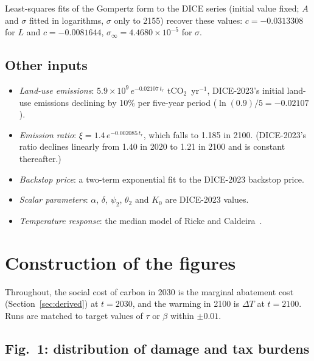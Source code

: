 \documentclass[11pt]{article}
\begin{document}
Least-squares fits of the Gompertz form to the DICE series (initial value
fixed; $A$ and $\sigma$ fitted in logarithms, $\sigma$ only to 2155) recover
these values: $c = -0.0313308$ for $L$ and $c = -0.0081644$,
$\sigma_\infty = 4.4680\times10^{-5}$ for $\sigma$.

\subsection{Other inputs}
\label{sec:other-inputs}

\begin{itemize}
  \item \emph{Land-use emissions}: $5.9\times10^9\,e^{-0.02107\,t_r}$
  tCO$_2$~yr$^{-1}$, DICE-2023's initial land-use emissions declining by 10\%
  per five-year period ($\ln(0.9)/5 = -0.02107$).
  \item \emph{Emission ratio}: $\xi = 1.4\,e^{-0.002085\,t_r}$, which falls to
  1.185 in 2100. (DICE-2023's ratio declines linearly from 1.40 in 2020 to
  1.21 in 2100 and is constant thereafter.)
  \item \emph{Backstop price}: a two-term exponential fit to the DICE-2023
  backstop price.
  \item \emph{Scalar parameters}: $\alpha$, $\delta$, $\psi_2$, $\theta_2$ and
  $K_0$ are DICE-2023 values.
  \item \emph{Temperature response}: the median model of
  Ricke and Caldeira~\cite{RickeCaldeira2014}.
\end{itemize}

\section{Construction of the figures}
\label{sec:figures}

Throughout, the social cost of carbon in 2030 is the marginal abatement cost
(Section~\ref{sec:derived}) at $t = 2030$, and the warming in 2100 is
$\Delta T$ at $t = 2100$. Runs are matched to target values of $\tau$ or
$\beta$ within $\pm0.01$.

\subsection{Fig.~1: distribution of damage and tax burdens}
\end{document}
